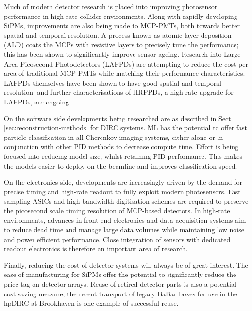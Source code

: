 
Much of modern detector research is placed into improving photosensor performance in high-rate collider environments. 
Along with rapidly developing SiPMs, improvements are also being made to MCP-PMTs, both towards better spatial and temporal resolution. A process known as 
atomic layer deposition (ALD) coats the MCPs with resistive layers to precisely tune the performance;\nolinebreak\cite{ald-mcps-Popecki_2016} this has been shown to significantly improve sensor ageing.\nolinebreak\cite{2013NIMPA.732..388C} Research into Large Area Picosecond Photodetectors (LAPPDs)
are attempting to reduce the cost per area of traditional MCP-PMTs while matching their performance characteristics. LAPPDs themselves have been shown to have 
good spatial and temporal resolution,\nolinebreak\cite{LYASHENKO2020162834} and further characterisations of HRPPDs, a high-rate upgrade for LAPPDs, 
are ongoing.\nolinebreak\cite{LYASHENKO2026170964,lappd-foulds-holt_2025}

On the software side developments being researched are as described in Sect \nolinebreak\ref{sec:reconstruction-methods} for DIRC systems. 
ML has the potential to offer fast particle classification in all Cherenkov imaging systems, either alone or in conjunction with other PID methods to decrease compute time. 
Effort is being focused into reducing model size, whilst retaining PID performance. This makes the models easier to deploy on the beamline 
and improves classification speed. 

On the electronics side, developments are increasingly driven by the demand for precise timing and high-rate readout to fully exploit modern
photosensors. Fast sampling ASICs\cite{Le-Pottier_2025} and high-bandwidth digitisation schemes\cite{WU2023167994} are required to preserve the picosecond scale 
timing resolution of MCP-based detectors. In high-rate environments, advances in front-end electronics and data acquisition systems aim to 
reduce dead time and manage large data volumes while maintaining low noise and power efficient performance. Close integration of sensors with dedicated readout 
electronics is therefore an important area of research.

Finally, reducing the cost of detector systems will always be of great interest. The ease of manufacturing for SiPMs offer the potential
to significantly reduce the price tag on detector arrays. Reuse of retired detector parts is also a potential cost saving measure; the recent transport of legacy BaBar boxes for use in the hpDIRC at Brookhaven is one example of successful reuse.\nolinebreak\cite{hpDIRC-Greg_2025}


